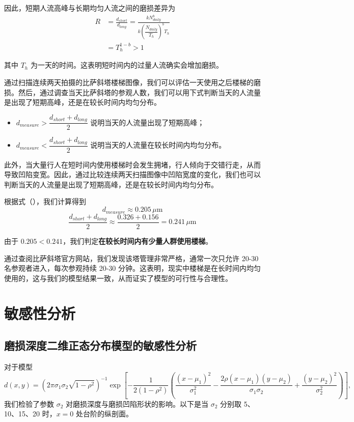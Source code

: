 \documentclass[11pt,a4paper]{ctexart}
\begin{document}
因此，短期人流高峰与长期均匀人流之间的磨损差异为
\begin{equation}
\begin{aligned}
R&=\frac{d_{short}}{d_{long}}=\frac{kN_{daily}^b}{k\left(\dfrac{N_{daily}}{T_h}\right)^bT_h}\\
&=T_h^{1-b}>1
\end{aligned}\tag{23}
\end{equation}

其中 $T_h$ 为一天的时间。这表明短时间内的过量人流确实会增加磨损。

通过扫描连续两天拍摄的比萨斜塔楼梯图像，我们可以评估一天使用之后楼梯的磨损。然后，通过调查当天比萨斜塔的参观人数，我们可以用下式判断当天的人流量是出现了短期高峰，还是在较长时间内均匀分布。

\begin{itemize}[leftmargin=2em,itemsep=2pt,topsep=2pt]
\item $d_{measure}>\dfrac{d_{short}+d_{long}}{2}$ 说明当天的人流量出现了短期高峰；
\item $d_{measure}<\dfrac{d_{short}+d_{long}}{2}$ 说明当天的人流量在较长时间内均匀分布。
\end{itemize}

此外，当大量行人在短时间内使用楼梯时会发生拥堵，行人倾向于交错行走，从而导致凹陷变宽。因此，通过比较连续两天扫描图像中凹陷宽度的变化，我们也可以判断当天的人流量是出现了短期高峰，还是在较长时间内均匀分布。

根据式（），我们计算得到
\[
d_{measure}\approx 0.205\,\mu\mathrm{m}
\]
\[
\frac{d_{short}+d_{long}}{2}\approx\frac{0.326+0.156}{2}=0.241\,\mu\mathrm{m}
\]

由于 $0.205<0.241$，我们判定\textbf{在较长时间内有少量人群使用楼梯}。

通过查阅比萨斜塔官方网站，我们发现该塔管理非常严格，通常一次只允许 20-30 名参观者进入，每次参观持续 20-30 分钟。这表明，现实中楼梯是在长时间内均匀使用的，这与我们的模型结果一致，从而证实了模型的可行性与合理性。

\section{敏感性分析}

\subsection{磨损深度二维正态分布模型的敏感性分析}

对于模型
\[
d(x,y)=\left(2\pi\sigma_1\sigma_2\sqrt{1-\rho^2}\right)^{-1}\exp\left[-\frac{1}{2(1-\rho^2)}\left(\frac{(x-\mu_1)^2}{\sigma_1^2}-\frac{2\rho(x-\mu_1)(y-\mu_2)}{\sigma_1\sigma_2}+\frac{(y-\mu_2)^2}{\sigma_2^2}\right)\right],
\]
我们检验了参数 $\sigma_2$ 对磨损深度与磨损凹陷形状的影响。以下是当 $\sigma_2$ 分别取 5、10、15、20 时，$x=0$ 处台阶的纵剖面。
\end{document}
